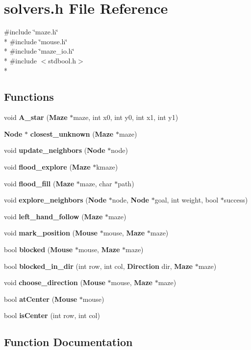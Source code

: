 \section{solvers.\-h File Reference}
\label{solvers_8h}
{\ttfamily \#include \char`\"{}maze.\-h\char`\"{}}\\*
{\ttfamily \#include \char`\"{}mouse.\-h\char`\"{}}\\*
{\ttfamily \#include \char`\"{}maze\-\_\-io.\-h\char`\"{}}\\*
{\ttfamily \#include $<$stdbool.\-h$>$}\\*
\subsection*{Functions}
\begin{DoxyCompactItemize}
\item 
void {\bf A\-\_\-star} ({\bf Maze} $\ast$maze, int x0, int y0, int x1, int y1)
\item 
{\bf Node} $\ast$ {\bf closest\-\_\-unknown} ({\bf Maze} $\ast$maze)
\item 
void {\bf update\-\_\-neighbors} ({\bf Node} $\ast$node)
\item 
void {\bf flood\-\_\-explore} ({\bf Maze} $\ast$kmaze)
\item 
void {\bf flood\-\_\-fill} ({\bf Maze} $\ast$maze, char $\ast$path)
\item 
void {\bf explore\-\_\-neighbors} ({\bf Node} $\ast$node, {\bf Node} $\ast$goal, int weight, bool $\ast$success)
\item 
void {\bf left\-\_\-hand\-\_\-follow} ({\bf Maze} $\ast$maze)
\item 
void {\bf mark\-\_\-position} ({\bf Mouse} $\ast$mouse, {\bf Maze} $\ast$maze)
\item 
bool {\bf blocked} ({\bf Mouse} $\ast$mouse, {\bf Maze} $\ast$maze)
\item 
bool {\bf blocked\-\_\-in\-\_\-dir} (int row, int col, {\bf Direction} dir, {\bf Maze} $\ast$maze)
\item 
void {\bf choose\-\_\-direction} ({\bf Mouse} $\ast$mouse, {\bf Maze} $\ast$maze)
\item 
bool {\bf at\-Center} ({\bf Mouse} $\ast$mouse)
\item 
bool {\bf is\-Center} (int row, int col)
\end{DoxyCompactItemize}


\subsection{Function Documentation}
